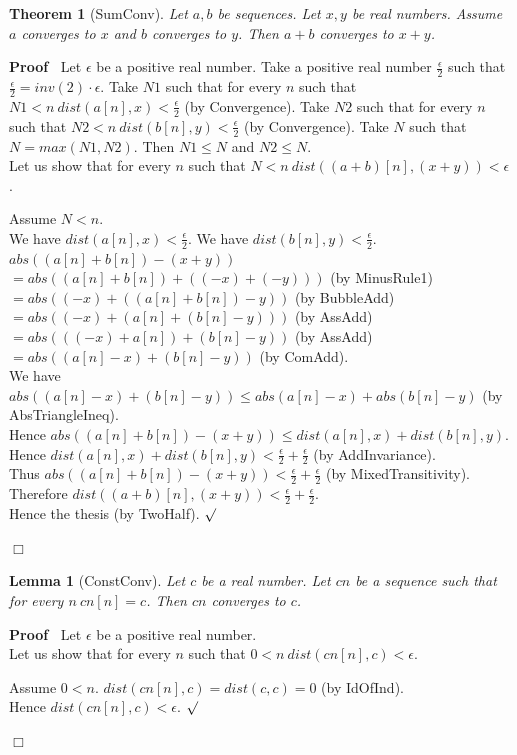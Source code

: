 \documentclass{article}
\newenvironment{forthel}{\begin{leftbar}}{\end{leftbar}}
\newenvironment{proof}{\noindent\textbf{Proof\ }}{\hspace*{\fill}$\Box$\medskip}
\newenvironment{subproof}{\begin{list}{}{}
		\item[\text{Proof}]}{\hfill $\surd$ \end{list}}
\newtheorem{lemma}{Lemma}
\newtheorem{theorem}{Theorem}
\newcommand{\plusone}{+}
\newcommand{\halfeps}{\frac{\epsilon}{2}}
\newcommand{\dotequal}{=}
\begin{document}
\begin{forthel}
	\begin{theorem}[SumConv]
	Let $a,b$ be sequences. Let $x,y$ be real numbers. Assume $a$ converges to $x$ and $b$ converges to $y$.
	Then $a \plusone b$ converges to $x + y$.
	\end{theorem}
	\begin{proof}
	Let $\epsilon$ be a positive real number.
	Take a positive real number $\halfeps$ such that $\halfeps = inv(2) \cdot \epsilon$.
	Take $N1$ such that for every $n$ such that $N1 < n \ dist(a[n],x) < \halfeps$ (by Convergence).
	Take $N2$ such that for every $n$ such that $N2 < n \ dist(b[n],y) < \halfeps$ (by Convergence).
	Take $N$ such that $N = max(N1,N2)$.
	Then $N1 \leq N$ and $N2 \leq N$.
	\\Let us show that for every $n$ such that $N < n \ dist((a \plusone b)[n],(x+y)) < \epsilon$.
	\begin{subproof}
	Assume $N < n$.
	\\We have $dist(a[n],x) < \halfeps$.
	We have $dist(b[n],y) < \halfeps$.
	\\$abs((a[n] + b[n]) - (x + y))$ 
	\\$\dotequal abs((a[n] + b[n]) + ((-x) + (-y)))$ (by MinusRule1)
	\\$\dotequal abs((-x) + ((a[n] + b[n]) - y))$ (by BubbleAdd)
	\\$\dotequal abs((-x) + (a[n] + (b[n] - y)))$ (by AssAdd)
	\\$\dotequal abs(((-x) + a[n]) + (b[n] - y))$ (by AssAdd)
	\\$\dotequal abs((a[n] - x) + (b[n] - y))$ (by ComAdd).
	\\We have $abs((a[n] - x) + (b[n] - y)) \leq abs(a[n] - x) + abs(b[n] - y)$  (by AbsTriangleIneq).
	\\Hence $abs((a[n] + b[n]) - (x + y)) \leq dist(a[n],x) + dist(b[n],y)$.
	\\Hence $dist(a[n],x) + dist(b[n],y) < \halfeps + \halfeps$ (by AddInvariance).
	\\Thus $abs((a[n] + b[n]) - (x + y)) < \halfeps + \halfeps$ (by MixedTransitivity).
	\\Therefore $dist((a \plusone b)[n],(x + y)) < \halfeps + \halfeps$.
	\\Hence the thesis (by TwoHalf).
	\end{subproof}
	\end{proof}
	
	\begin{lemma}[ConstConv]
	Let $c$ be a real number. Let $cn$ be a sequence such that for every $n \ cn[n] = c$.
	Then $cn$ converges to $c$.
	\end{lemma}
	\begin{proof}
	Let $\epsilon$ be a positive real number.
	\\Let us show that for every $n$ such that $0 < n \ dist(cn[n],c) < \epsilon$.
	\begin{subproof}
	Assume $0 < n$.
	$dist(cn[n],c) = dist(c,c) = 0$ (by IdOfInd).
	\\Hence $dist(cn[n],c) < \epsilon$.
	\end{subproof}
	\end{proof}
	

\end{forthel}
\end{document}
